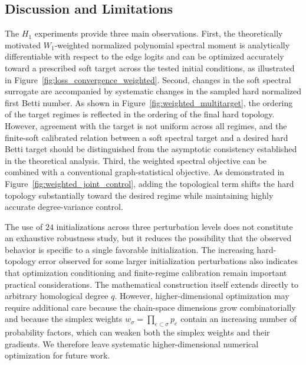 \documentclass[pdflatex,sn-mathphys-num]{sn-jnl}%
\theoremstyle{thmstyleone}%
\theoremstyle{thmstyletwo}%
\theoremstyle{thmstylethree}%
\begin{document}
\subsection{Discussion and Limitations}

The \(H_1\) experiments provide three main observations.
First, the theoretically motivated \(W_1\)-weighted normalized polynomial spectral moment is analytically differentiable with respect to the edge logits and can be optimized accurately toward a prescribed soft target across the tested initial conditions, as illustrated in Figure~\ref{fig:loss_convergence_weighted}.
Second, changes in the soft spectral surrogate are accompanied by systematic changes in the sampled hard normalized first Betti number.
As shown in Figure~\ref{fig:weighted_multitarget}, the ordering of the target regimes is reflected in the ordering of the final hard topology.
However, agreement with the target is not uniform across all regimes, and the finite-soft calibrated relation between a soft spectral target and a desired hard Betti target should be distinguished from the asymptotic consistency established in the theoretical analysis.
Third, the weighted spectral objective can be combined with a conventional graph-statistical objective.
As demonstrated in Figure~\ref{fig:weighted_joint_control}, adding the topological term shifts the hard topology substantially toward the desired regime while maintaining highly accurate degree-variance control.

The use of \(24\) initializations across three perturbation levels does not constitute an exhaustive robustness study, but it reduces the possibility that the observed behavior is specific to a single favorable initialization.
The increasing hard-topology error observed for some larger initialization perturbations also indicates that optimization conditioning and finite-regime calibration remain important practical considerations.
The mathematical construction itself extends directly to arbitrary homological degree \(q\).
However, higher-dimensional optimization may require additional care because the chain-space dimensions grow combinatorially and because the simplex weights
$w_\sigma
=
\prod_{e\subset\sigma}p_e$
contain an increasing number of probability factors, which can weaken both the simplex weights and their gradients.
We therefore leave systematic higher-dimensional numerical optimization for future work.
\end{document}
